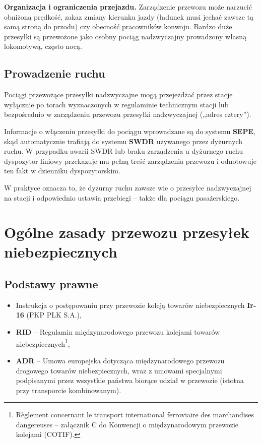 \textbf{Organizacja i ograniczenia przejazdu.} Zarządzenie przewozu może narzucić obniżoną prędkość, zakaz zmiany kierunku jazdy (ładunek musi jechać zawsze tą samą stroną do przodu) czy obecność pracowników konwoju. Bardzo duże przesyłki są przewożone jako osobny pociąg nadzwyczajny prowadzony własną lokomotywą, często nocą.

\section{Prowadzenie ruchu}

Pociągi przewożące przesyłki nadzwyczajne mogą przejeżdżać przez stacje wyłącznie po torach wyznaczonych w regulaminie technicznym stacji lub bezpośrednio w zarządzeniu przewozu przesyłki nadzwyczajnej („adres cztery”).

Informacje o włączeniu przesyłki do pociągu wprowadzane są do systemu \textbf{SEPE}, skąd automatycznie trafiają do systemu \textbf{SWDR} używanego przez dyżurnych ruchu. W przypadku awarii SWDR lub braku zarządzenia u dyżurnego ruchu dyspozytor liniowy przekazuje mu pełną treść zarządzenia przewozu i odnotowuje ten fakt w dzienniku dyspozytorskim.

W praktyce oznacza to, że dyżurny ruchu zawsze wie o przesyłce nadzwyczajnej na stacji i odpowiednio ustawia przebiegi – także dla pociągu pasażerskiego.

\chapter{Ogólne zasady przewozu przesyłek niebezpiecznych}

\section{Podstawy prawne}

\begin{itemize}
	\item Instrukcja o postępowaniu przy przewozie koleją towarów niebezpiecznych \textbf{Ir-16} (PKP PLK S.A.),
	\item \textbf{RID} – Regulamin międzynarodowego przewozu kolejami towarów niebezpiecznych\footnote{Règlement concernant le transport international ferroviaire des marchandises dangereuses – załącznik C do Konwencji o międzynarodowym przewozie kolejami (COTIF).},
	\item \textbf{ADR} – Umowa europejska dotycząca międzynarodowego przewozu drogowego towarów niebezpiecznych, wraz z umowami specjalnymi podpisanymi przez wszystkie państwa biorące udział w przewozie (istotna przy transporcie kombinowanym).
\end{itemize}

